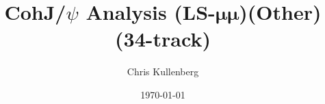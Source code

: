 \title{CohJ/$\psi$ Analysis (\textbf{LS}-$\boldsymbol{\mu\mu}$)(\textbf{Other})(\textbf{34-track})}
\author{Chris Kullenberg}
\date{\today}
